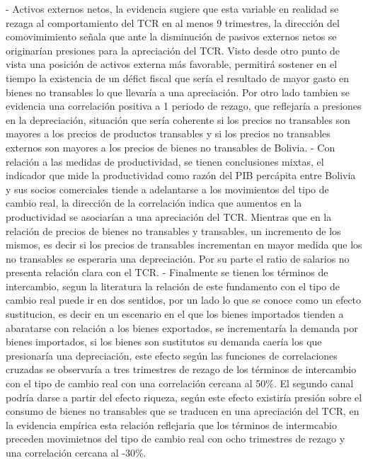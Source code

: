 \documentclass[12pt,letterpaper]{article}
\begin{document}
- Activos externos netos, la evidencia sugiere que esta variable en realidad se rezaga al comportamiento del TCR en al menos 9 trimestres, la dirección del comovimimiento señala que ante la disminución de pasivos externos netos se originarían presiones para la apreciación del TCR. Visto desde otro punto de vista una posición de activos externa más favorable, permitirá sostener en el tiempo la existencia de un défict fiscal que sería el resultado de mayor gasto en bienes no transables lo que llevaría a una apreciación. Por otro lado tambien se evidencia una correlación positiva a 1 periodo de rezago, que reflejaría a presiones en la depreciación, situación que sería coherente  si los precios no transables son mayores a los precios de productos transables y si los precios no transables externos son mayores a los precios de bienes no transables de Bolivia. 
- Con relación a las medidas de productividad, se tienen conclusiones mixtas, el indicador que mide la productividad como razón del PIB percápita entre Bolivia y sus socios comerciales tiende a adelantarse a los movimientos del tipo de cambio real, la dirección de la correlación indica que aumentos en la productividad se asociarían a una apreciación del TCR. Mientras que en la relación de precios de bienes no transables y transables, un incremento de los mismos, es decir si los precios de transables incrementan en mayor medida que los no transables se esperaria una depreciación. Por su parte el ratio de salarios no presenta relación clara con el TCR.
- Finalmente se tienen los términos de intercambio, segun la literatura la relación de este fundamento con el tipo de cambio real puede ir en dos sentidos, por un lado lo que se conoce como un efecto sustitucion, es decir en un escenario en el que los bienes importados tienden a abaratarse con relación a los bienes exportados, se incrementaría la demanda por bienes importados, si los bienes son sustitutos su demanda caería los que presionaría una depreciación, este efecto según las funciones de correlaciones cruzadas se observaría a tres trimestres de rezago de los términos de intercambio con el tipo de cambio real con una correlación cercana al 50\%. El segundo canal podría darse a partir del efecto riqueza, según este efecto existiría presión sobre el consumo de bienes no transables que se traducen en una apreciación del TCR, en la evidencia empírica esta relación reflejaria que los términos de intermcabio preceden movimietnos del tipo de cambio real con ocho trimestres de rezago y una correlación cercana al -30\%. 
\end{document}
